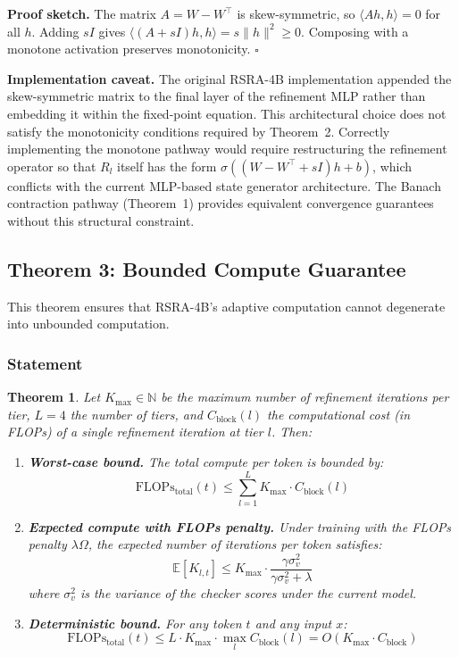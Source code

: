 \documentclass[11pt,a4paper]{article}
\newtheorem{theorem}{Theorem}
\theoremstyle{definition}
\begin{document}
\noindent\textbf{Proof sketch.} The matrix $A = W - W^\top$ is skew-symmetric, so $\langle Ah, h \rangle = 0$ for all $h$. Adding $sI$ gives $\langle (A + sI)h, h \rangle = s\|h\|^2 \geq 0$. Composing with a monotone activation preserves monotonicity. \hfill$\square$

\noindent\textbf{Implementation caveat.} The original RSRA-4B implementation appended the skew-symmetric matrix to the final layer of the refinement MLP rather than embedding it within the fixed-point equation. This architectural choice does not satisfy the monotonicity conditions required by Theorem~2. Correctly implementing the monotone pathway would require restructuring the refinement operator so that $R_l$ itself has the form $\sigma((W - W^\top + sI)h + b)$, which conflicts with the current MLP-based state generator architecture. The Banach contraction pathway (Theorem~1) provides equivalent convergence guarantees without this structural constraint.

\subsection{Theorem 3: Bounded Compute Guarantee}

This theorem ensures that RSRA-4B's adaptive computation cannot degenerate into unbounded computation.

\subsubsection{Statement}

\begin{theorem}
Let $K_{\max} \in \mathbb{N}$ be the maximum number of refinement iterations per tier, $L = 4$ the number of tiers, and $C_{\mathrm{block}}(l)$ the computational cost (in FLOPs) of a single refinement iteration at tier $l$. Then:
\begin{enumerate}
    \item \textbf{Worst-case bound.} The total compute per token is bounded by:
    \[ \mathrm{FLOPs}_{\mathrm{total}}(t) \leq \sum_{l=1}^{L} K_{\max} \cdot C_{\mathrm{block}}(l) \]
    \item \textbf{Expected compute with FLOPs penalty.} Under training with the FLOPs penalty $\lambda \Omega$, the expected number of iterations per token satisfies:
    \[ \mathbb{E}[K_{l,t}] \leq K_{\max} \cdot \frac{\gamma \sigma_v^2}{\gamma \sigma_v^2 + \lambda} \]
    where $\sigma_v^2$ is the variance of the checker scores under the current model.
    \item \textbf{Deterministic bound.} For any token $t$ and any input $x$:
    \[ \mathrm{FLOPs}_{\mathrm{total}}(t) \leq L \cdot K_{\max} \cdot \max_l C_{\mathrm{block}}(l) = O(K_{\max} \cdot C_{\mathrm{block}}) \]
\end{enumerate}
\end{theorem}
\end{document}

